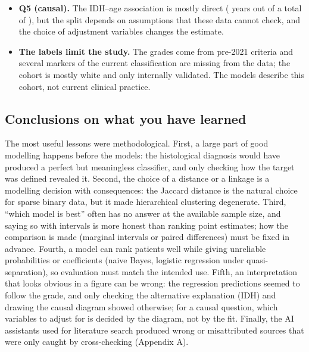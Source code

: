 \begin{itemize}
        a non-linear effect of age in the tree ensembles, the inflated role of NOTCH1 in logistic
        regression, and CIC versus ATRX as the inputs that separate the two lower-grade families.
  \item \textbf{Q5 (causal).} The IDH--age association is mostly direct (\CsDirect{} years out of a
        total of \CsTotal), but the split depends on assumptions that these data cannot check, and the
        choice of adjustment variables changes the estimate.
  \item \textbf{The labels limit the study.} The grades come from pre-2021 criteria and several
        markers of the current classification are missing from the data; the cohort is mostly white
        and only internally validated. The models describe this cohort, not current clinical
        practice.
\end{itemize}

\subsection{Conclusions on what you have learned}

The most useful lessons were methodological. First, a large part of good modelling happens before
the models: the histological diagnosis would have produced a perfect but meaningless classifier, and
only checking how the target was defined revealed it. Second, the choice of a distance or a linkage
is a modelling decision with consequences: the Jaccard distance is the natural choice for sparse
binary data, but it made hierarchical clustering degenerate. Third, ``which model is best'' often has
no answer at the available sample size, and saying so with intervals is more honest than ranking
point estimates; how the comparison is made (marginal intervals or paired differences) must be fixed
in advance. Fourth, a model can rank patients well while giving unreliable probabilities or
coefficients (naive Bayes, logistic regression under quasi-separation), so evaluation must match the
intended use. Fifth, an interpretation that looks obvious in a figure can be wrong: the regression
predictions seemed to follow the grade, and only checking the alternative explanation (IDH) and
drawing the causal diagram showed otherwise; for a causal question, which variables to adjust for is
decided by the diagram, not by the fit. Finally, the AI assistants used for literature search produced wrong or misattributed
sources that were only caught by cross-checking (Appendix A).
